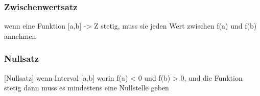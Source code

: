 
\subsubsection{Zwischenwertsatz}
\begin{theorem}
    [Zwischenwertsatz] wenn eine Funktion [a,b] -> Z stetig, muss sie jeden Wert zwischen f(a) und f(b) annehmen
\end{theorem}

\subsubsection{Nullsatz}

\begin{theorem}
    \label{th_nullsatz}
    [Nullsatz] wenn Interval [a,b] worin f(a) < 0 und f(b) > 0, und die Funktion stetig dann muss es mindestens eine Nullstelle geben
\end{theorem}

